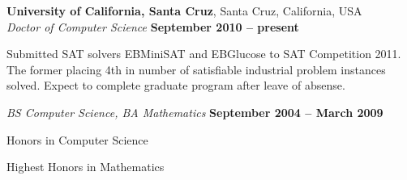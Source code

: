 \documentclass[margin,line]{resume}
\begin{document}
\begin{resume}
    \textbf{University of California, Santa Cruz}, Santa Cruz, California, USA \vspace{2mm}\\\vspace{1mm}%
    \textsl{Doctor of Computer Science} \hfill \textbf{ September 2010 -- present}\vspace{-3mm}\\\vspace{-1mm}%
    \begin{mylist}
        \item Submitted SAT solvers EBMiniSAT and EBGlucose to SAT Competition 2011.
            The former placing 4th in number of satisfiable industrial problem instances solved.
            Expect to complete graduate program after leave of absense.
    \end{mylist}\vspace{-1.5mm}
    \textsl{BS Computer Science, BA Mathematics} \hfill \textbf{September 2004 -- March 2009}\vspace{-3mm}\\\vspace{-1mm}%
    \begin{mylist}
        \item Honors in Computer Science
        \item Highest Honors in Mathematics
    \end{mylist}


%


\end{resume}
\end{document}

